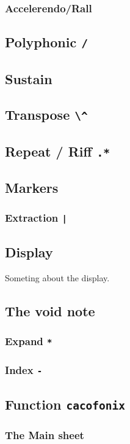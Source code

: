 \documentclass{article}
\begin{document}
\subsubsection{Accelerendo/Rall}

\subsection{Polyphonic \lstinline!/!}

\subsection{Sustain}

\subsection{Transpose \lstinline!\^!}

\subsection{Repeat / Riff \lstinline!.*!}

\subsection{Markers}
\subsubsection{Extraction \lstinline!|!}

\subsection{Display}

Someting about the display.

\subsection{The void note}


\subsubsection{Expand \lstinline!*!}
\subsubsection{Index \lstinline!-!}

\subsection{Function \lstinline!cacofonix!}
\subsubsection{The Main sheet}
\end{document}
